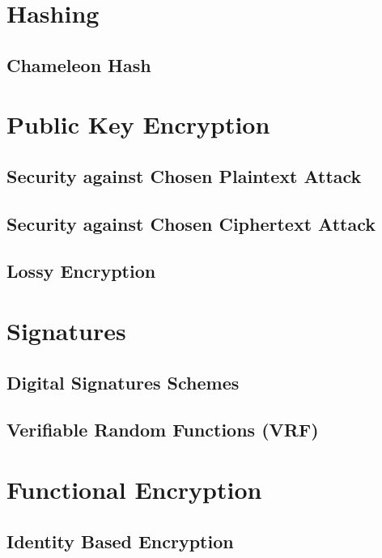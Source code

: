 \chapter{Hashing}
	\section{Chameleon Hash}
	

\chapter{Public Key Encryption}
	\section{Security against Chosen Plaintext Attack}
	
	

	\section{Security against Chosen Ciphertext Attack}
	
	
	\section{Lossy Encryption}
	

\chapter{Signatures}
	\section{Digital Signatures Schemes}
	
	
	
	\section{Verifiable Random Functions (VRF)}	
	
	
	
	
\chapter{Functional Encryption}
	\section{Identity Based Encryption}
	
	
	
